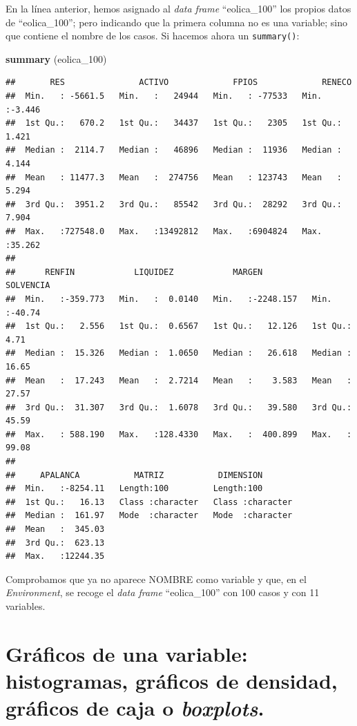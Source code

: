 \documentclass[
]{book}
\newenvironment{Shaded}{\begin{snugshade}}{\end{snugshade}}
\newcommand{\FunctionTok}[1]{\textcolor[rgb]{0.13,0.29,0.53}{\textbf{#1}}}
\newcommand{\NormalTok}[1]{#1}
\begin{document}
En la línea anterior, hemos asignado al \emph{data frame} ``eolica\_100'' los propios datos de ``eolica\_100''; pero indicando que la primera columna no es una variable; sino que contiene el nombre de los casos. Si hacemos ahora un \texttt{summary()}:

\begin{Shaded}
\begin{Highlighting}[]
\FunctionTok{summary}\NormalTok{ (eolica\_100)}
\end{Highlighting}
\end{Shaded}

\begin{verbatim}
##       RES               ACTIVO             FPIOS             RENECO      
##  Min.   : -5661.5   Min.   :   24944   Min.   : -77533   Min.   :-3.446  
##  1st Qu.:   670.2   1st Qu.:   34437   1st Qu.:   2305   1st Qu.: 1.421  
##  Median :  2114.7   Median :   46896   Median :  11936   Median : 4.144  
##  Mean   : 11477.3   Mean   :  274756   Mean   : 123743   Mean   : 5.294  
##  3rd Qu.:  3951.2   3rd Qu.:   85542   3rd Qu.:  28292   3rd Qu.: 7.904  
##  Max.   :727548.0   Max.   :13492812   Max.   :6904824   Max.   :35.262  
## 
##      RENFIN            LIQUIDEZ            MARGEN            SOLVENCIA     
##  Min.   :-359.773   Min.   :  0.0140   Min.   :-2248.157   Min.   :-40.74  
##  1st Qu.:   2.556   1st Qu.:  0.6567   1st Qu.:   12.126   1st Qu.:  4.71  
##  Median :  15.326   Median :  1.0650   Median :   26.618   Median : 16.65  
##  Mean   :  17.243   Mean   :  2.7214   Mean   :    3.583   Mean   : 27.57  
##  3rd Qu.:  31.307   3rd Qu.:  1.6078   3rd Qu.:   39.580   3rd Qu.: 45.59  
##  Max.   : 588.190   Max.   :128.4330   Max.   :  400.899   Max.   : 99.08  
## 
##     APALANCA           MATRIZ           DIMENSION        
##  Min.   :-8254.11   Length:100         Length:100        
##  1st Qu.:   16.13   Class :character   Class :character  
##  Median :  161.97   Mode  :character   Mode  :character  
##  Mean   :  345.03                                        
##  3rd Qu.:  623.13                                        
##  Max.   :12244.35
\end{verbatim}

Comprobamos que ya no aparece NOMBRE como variable y que, en el \emph{Environment}, se recoge el \emph{data frame} ``eolica\_100'' con 100 casos y con 11 variables.

\section{\texorpdfstring{Gráficos de una variable: histogramas, gráficos de densidad, gráficos de caja o \emph{boxplots}.}{Gráficos de una variable: histogramas, gráficos de densidad, gráficos de caja o boxplots.}}\label{gruxe1ficos-de-una-variable-histogramas-gruxe1ficos-de-densidad-gruxe1ficos-de-caja-o-boxplots.}
\end{document}
